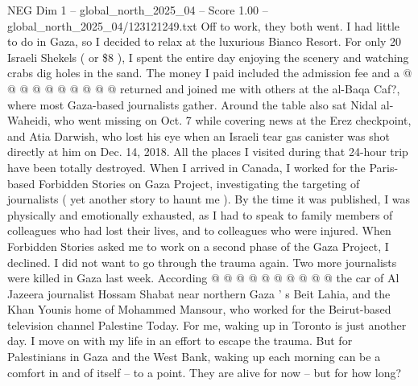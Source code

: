 \begin{textsample}{NEG Dim 1 – global\_north\_2025\_04 – Score 1.00 – global\_north\_2025\_04/123121249.txt}
Off to work, they both went.
I had little to do in Gaza, so I decided to relax at the luxurious Bianco Resort.
For only 20 Israeli Shekels ( or \$8 ), I spent the entire day enjoying the scenery and watching crabs dig holes in the sand.
The money I paid included the admission fee and a @ @ @ @ @ @ @ @ @ @ returned and joined me with others at the al-Baqa Caf?, where most Gaza-based journalists gather.
Around the table also sat Nidal al-Waheidi, who went missing on Oct. 7 while covering news at the Erez checkpoint, and Atia Darwish, who lost his eye when an Israeli tear gas canister was shot directly at him on Dec. 14, 2018.
All the places I visited during that 24-hour trip have been totally destroyed.
When I arrived in Canada, I worked for the Paris-based Forbidden Stories on Gaza Project, investigating the targeting of journalists ( yet another story to haunt me ).
By the time it was published, I was physically and emotionally exhausted, as I had to speak to family members of colleagues who had lost their lives, and to colleagues who were injured.
When Forbidden Stories asked me to work on a second phase of the Gaza Project, I declined.
I did not want to go through the trauma again.
Two more journalists were killed in Gaza last week.
According @ @ @ @ @ @ @ @ @ @ the car of Al Jazeera journalist Hossam Shabat near northern Gaza ' s Beit Lahia, and the Khan Younis home of Mohammed Mansour, who worked for the Beirut-based television channel Palestine Today.
For me, waking up in Toronto is just another day.
I move on with my life in an effort to escape the trauma.
But for Palestinians in Gaza and the West Bank, waking up each morning can be a comfort in and of itself -- to a point.
They are alive for now -- but for how long?

\end{textsample}
